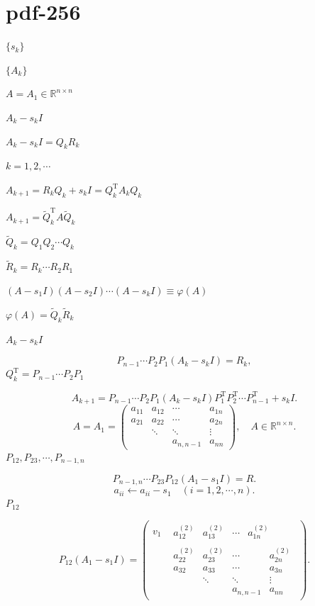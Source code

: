 \documentclass[UTF8,fontset=fandol]{ctexart}
\begin{document}
\section*{pdf-256}
$\{s_k\}$\par
$\{A_k\}$\par
$A=A_1\in\mathbb R^{n\times n}$\par
$A_k-s_kI$\par
$A_k-s_kI=Q_kR_k$\par
$k=1,2,\cdots$\par
$A_{k+1}=R_kQ_k+s_kI=Q_k^{\mathrm T}A_kQ_k$\par
$A_{k+1}=\widetilde Q_k^{\mathrm T}A\widetilde Q_k$\par
$\widetilde Q_k=Q_1Q_2\cdots Q_k$\par
$\widetilde R_k=R_k\cdots R_2R_1$\par
$(A-s_1I)(A-s_2I)\cdots(A-s_kI)\equiv\varphi(A)$\par
$\varphi(A)=\widetilde Q_k\widetilde R_k$\par
$A_k-s_kI$\par
\[
P_{n-1}\cdots P_2P_1(A_k-s_kI)=R_k,
\]
$Q_k^{\mathrm T}=P_{n-1}\cdots P_2P_1$\par
\[
A_{k+1}=P_{n-1}\cdots P_2P_1(A_k-s_kI)P_1^{\mathrm T}P_2^{\mathrm T}\cdots P_{n-1}^{\mathrm T}+s_kI.
\]
\[
A=A_1=\begin{pmatrix}
a_{11}&a_{12}&\cdots&a_{1n}\\
a_{21}&a_{22}&\cdots&a_{2n}\\
&\ddots&\ddots&\vdots\\
&&a_{n,n-1}&a_{nn}
\end{pmatrix},\quad A\in\mathbb R^{n\times n}.
\]
$P_{12},P_{23},\cdots,P_{n-1,n}$\par
\[
P_{n-1,n}\cdots P_{23}P_{12}(A_1-s_1I)=R.
\]
\[
a_{ii}\leftarrow a_{ii}-s_1\quad(i=1,2,\cdots,n).
\]
$P_{12}$\par
\[
P_{12}(A_1-s_1I)=\begin{pmatrix}
v_1&\begin{matrix}a_{12}^{(2)}&a_{13}^{(2)}&\cdots&a_{1n}^{(2)}\end{matrix}\\
&\boxed{\begin{matrix}
a_{22}^{(2)}&a_{23}^{(2)}&\cdots&a_{2n}^{(2)}\\
a_{32}&a_{33}&\cdots&a_{3n}\\
&\ddots&\ddots&\vdots\\
&&a_{n,n-1}&a_{nn}
\end{matrix}}
\end{pmatrix}.
\]
\end{document}
